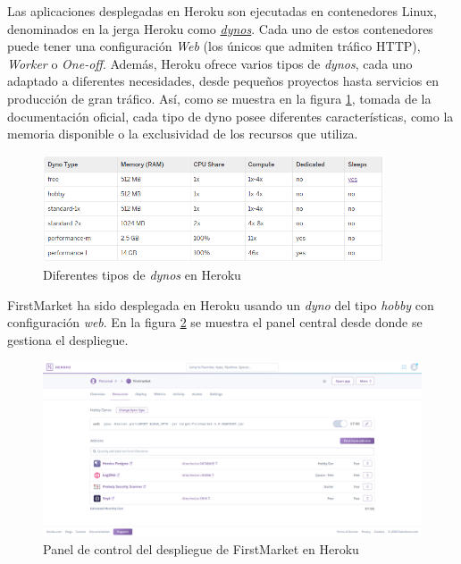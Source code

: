 \documentclass[a4paper]{article}
\begin{document}
    Las aplicaciones desplegadas en Heroku son ejecutadas en contenedores Linux, denominados en la jerga Heroku como \href{https://devcenter.heroku.com/articles/dynos}{\emph{dynos}}. Cada uno de estos contenedores puede tener una configuración \emph{Web} (los únicos que admiten tráfico HTTP), \emph{Worker} o \emph{One-off}. Además, Heroku ofrece varios tipos de \emph{dynos}, cada uno adaptado a diferentes necesidades, desde pequeños proyectos hasta servicios en producción de gran tráfico. Así, como se muestra en la figura \ref{fig:dyno_types}, tomada de la documentación oficial, cada tipo de dyno posee diferentes características, como la memoria disponible o la exclusividad de los recursos que utiliza.
    
    \begin{figure}[hbt!]
       	\centering
       	\includegraphics[width=0.9\textwidth,keepaspectratio]{dyno_types}
       	\caption{Diferentes tipos de \emph{dynos} en Heroku}
       	\label{fig:dyno_types}
    \end{figure}
    
    FirstMarket ha sido desplegada en Heroku usando un \emph{dyno} del tipo \emph{hobby} con configuración \emph{web}. En la figura \ref{fig:heroku} se muestra el panel central desde donde se gestiona el despliegue.
    
    \begin{figure}[hbt!]
       	\centering
       	\includegraphics[width=\textwidth,keepaspectratio]{heroku}
       	\caption{Panel de control del despliegue de FirstMarket en Heroku}
       	\label{fig:heroku}
    \end{figure}
\end{document}
